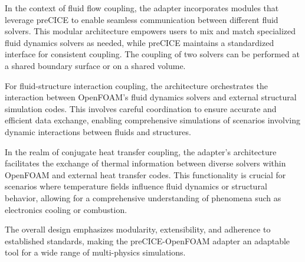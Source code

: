 In the context of fluid flow coupling, the adapter incorporates modules that leverage preCICE to enable seamless communication between different fluid solvers. This modular architecture empowers users to mix and match specialized fluid dynamics solvers as needed, while preCICE maintains a standardized interface for consistent coupling. The coupling of two solvers can be performed at a shared boundary surface or on a shared volume.

For fluid-structure interaction coupling, the architecture orchestrates the interaction between OpenFOAM's fluid dynamics solvers and external structural simulation codes. This involves careful coordination to ensure accurate and efficient data exchange, enabling comprehensive simulations of scenarios involving dynamic interactions between fluids and structures.

In the realm of conjugate heat transfer coupling, the adapter's architecture facilitates the exchange of thermal information between diverse solvers within OpenFOAM and external heat transfer codes. This functionality is crucial for scenarios where temperature fields influence fluid dynamics or structural behavior, allowing for a comprehensive understanding of phenomena such as electronics cooling or combustion.

The overall design emphasizes modularity, extensibility, and adherence to established standards, making the preCICE-OpenFOAM adapter an adaptable tool for a wide range of multi-physics simulations.


